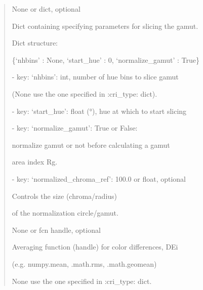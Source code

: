 \documentclass[letterpaper,10pt,english]{sphinxmanual}
\begin{document}
\begin{fulllineitems}
\begin{description}
\begin{quote}
\begin{description}
\item[{rg\_pars}] \leavevmode
\begin{DUlineblock}{0em}
\item[] None or dict, optional
\item[] Dict containing specifying parameters for slicing the gamut.
\item[] Dict structure: 
\item[]
\begin{DUlineblock}{\DUlineblockindent}
\item[]
\begin{DUlineblock}{\DUlineblockindent}
\item[] \{‘nhbins’ : None, ‘start\_hue’ : 0, ‘normalize\_gamut’ : True\}
\end{DUlineblock}
\item[] - key: ‘nhbins’: int, number of hue bins to slice gamut 
\item[]
\begin{DUlineblock}{\DUlineblockindent}
\item[] (None use the one specified in :cri\_type: dict).
\end{DUlineblock}
\item[] - key: ‘start\_hue’: float (°), hue at which to start slicing
\item[] - key: ‘normalize\_gamut’: True or False: 
\item[]
\begin{DUlineblock}{\DUlineblockindent}
\item[] normalize gamut or not before calculating a gamut 
\item[] area index Rg. 
\end{DUlineblock}
\item[] - key: ‘normalized\_chroma\_ref’: 100.0 or float, optional
\item[]
\begin{DUlineblock}{\DUlineblockindent}
\item[] Controls the size (chroma/radius) 
\item[] of the normalization circle/gamut.
\end{DUlineblock}
\end{DUlineblock}
\end{DUlineblock}

\item[{avg}] \leavevmode
\begin{DUlineblock}{0em}
\item[] None or fcn handle, optional
\item[] Averaging function (handle) for color differences, DEi 
\item[] (e.g. numpy.mean, .math.rms, .math.geomean)
\item[] None use the one specified in :cri\_type: dict.
\end{DUlineblock}


\end{description}
\end{quote}
\end{description}
\end{fulllineitems}
\end{document}
